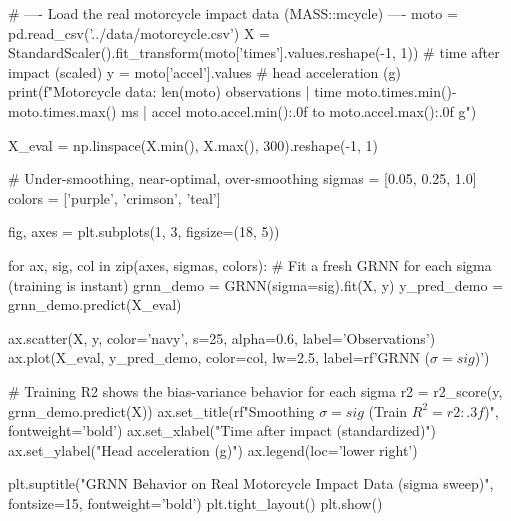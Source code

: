 \begin{codebox}[title={Load the real motorcycle impact data (MASS::mcycle)}]
# ---- Load the real motorcycle impact data (MASS::mcycle) ----
moto = pd.read_csv('../data/motorcycle.csv')
X = StandardScaler().fit_transform(moto['times'].values.reshape(-1, 1))  # time after impact (scaled)
y = moto['accel'].values                                                 # head acceleration (g)
print(f"Motorcycle data: {len(moto)} observations | time {moto.times.min()}-{moto.times.max()} ms | accel {moto.accel.min():.0f} to {moto.accel.max():.0f} g")

X_eval = np.linspace(X.min(), X.max(), 300).reshape(-1, 1)

# Under-smoothing, near-optimal, over-smoothing
sigmas = [0.05, 0.25, 1.0]
colors = ['purple', 'crimson', 'teal']

fig, axes = plt.subplots(1, 3, figsize=(18, 5))

for ax, sig, col in zip(axes, sigmas, colors):
    # Fit a fresh GRNN for each sigma (training is instant)
    grnn_demo = GRNN(sigma=sig).fit(X, y)
    y_pred_demo = grnn_demo.predict(X_eval)

    ax.scatter(X, y, color='navy', s=25, alpha=0.6, label='Observations')
    ax.plot(X_eval, y_pred_demo, color=col, lw=2.5, label=rf'GRNN ($\sigma={sig}$)')

    # Training R2 shows the bias-variance behavior for each sigma
    r2 = r2_score(y, grnn_demo.predict(X))
    ax.set_title(rf"Smoothing $\sigma = {sig}$ (Train $R^2 = {r2:.3f}$)", fontweight='bold')
    ax.set_xlabel("Time after impact (standardized)")
    ax.set_ylabel("Head acceleration (g)")
    ax.legend(loc='lower right')

plt.suptitle("GRNN Behavior on Real Motorcycle Impact Data (sigma sweep)", fontsize=15, fontweight='bold')
plt.tight_layout()
plt.show()
\end{codebox}

